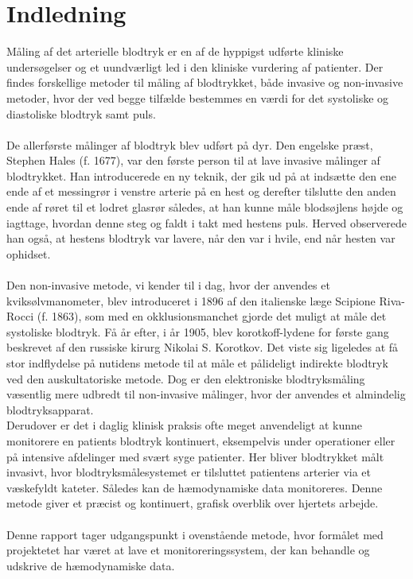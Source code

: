 \chapter{Indledning}
Måling af det arterielle blodtryk er en af de hyppigst udførte kliniske undersøgelser og et uundværligt led i den kliniske vurdering af patienter. Der findes forskellige metoder til måling af blodtrykket, både invasive og non-invasive metoder, hvor der ved begge tilfælde bestemmes en værdi for det systoliske og diastoliske blodtryk samt puls. \\\\
De allerførste målinger af blodtryk blev udført på dyr. Den engelske præst, Stephen Hales (f. 1677), var den første person til at lave invasive målinger af blodtrykket. Han introducerede en ny teknik, der gik ud på at indsætte den ene ende af et messingrør i venstre arterie på en hest og derefter tilslutte den anden ende af røret til et lodret glasrør således, at han kunne måle blodsøjlens højde og iagttage, hvordan denne steg og faldt i takt med hestens puls. Herved observerede han også, at hestens blodtryk var lavere, når den var i hvile, end når hesten var ophidset. \\\\
Den non-invasive metode, vi kender til i dag, hvor der anvendes et kviksølvmanometer, blev introduceret i 1896 af den italienske læge Scipione Riva-Rocci (f. 1863), som med en okklusionsmanchet gjorde det muligt at måle det systoliske blodtryk. Få år efter, i år 1905, blev korotkoff-lydene for første gang beskrevet af den russiske kirurg Nikolai S. Korotkov. Det viste sig ligeledes at få stor indflydelse på nutidens metode til at måle et pålideligt indirekte blodtryk ved den auskultatoriske metode. Dog er den elektroniske blodtryksmåling væsentlig mere udbredt til non-invasive målinger, hvor der anvendes et almindelig blodtryksapparat. \\
Derudover er det i daglig klinisk praksis ofte meget anvendeligt at kunne monitorere en patients blodtryk kontinuert, eksempelvis under operationer eller på intensive afdelinger med svært syge patienter. Her bliver blodtrykket målt invasivt, hvor blodtryksmålesystemet er tilsluttet patientens arterier via et væskefyldt kateter. Således kan de hæmodynamiske data monitoreres. Denne metode giver et præcist og kontinuert, grafisk overblik over hjertets arbejde. \\\\
Denne rapport tager udgangspunkt i ovenstående metode, hvor formålet med projektetet har været at lave et monitoreringssystem, der kan behandle og udskrive de hæmodynamiske data.






